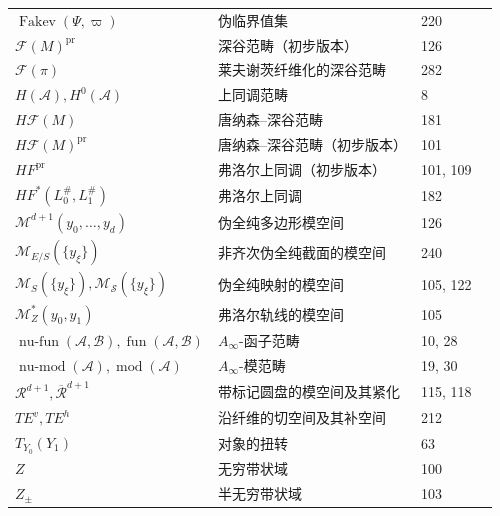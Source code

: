 \begin{longtable}{@{}p{.26\linewidth}p{.41\linewidth}p{.12\linewidth}p{.12\linewidth}@{}}
\(\operatorname{Fakev}(\Psi,\varpi)\) & 伪临界值集 & 220 & \pageref{ch:15-first-notions}\\
\(\mathcal F(M)^{\mathrm{pr}}\) & 深谷范畴（初步版本） & 126 & \pageref{ch:09-fukaya-preliminary}\\
\(\mathcal F(\pi)\) & 莱夫谢茨纤维化的深谷范畴 & 282 & \pageref{ch:18-fukaya-lefschetz}\\
\(H(\mathcal A),H^0(\mathcal A)\) & 上同调范畴 & 8 & \pageref{ch:01-definitions}\\
\(H\mathcal F(M)\) & 唐纳森--深谷范畴 & 181 & \pageref{ch:12-fukaya-complete}\\
\(H\mathcal F(M)^{\mathrm{pr}}\) & 唐纳森--深谷范畴（初步版本） & 101 & \pageref{ch:08-classical-floer}\\
\(HF^{\mathrm{pr}}\) & 弗洛尔上同调（初步版本） & 101, 109 & \pageref{ch:08-classical-floer}\\
\(HF^*(L_0^\#,L_1^\#)\) & 弗洛尔上同调 & 182 & \pageref{ch:12-fukaya-complete}\\
\(\mathcal M^{d+1}(y_0,\ldots,y_d)\) & 伪全纯多边形模空间 & 126 & \pageref{ch:09-fukaya-preliminary}\\
\(\mathcal M_{E/S}(\{y_\xi\})\) & 非齐次伪全纯截面的模空间 & 240 & \pageref{ch:17-pseudoholomorphic-sections}\\
\(\mathcal M_S(\{y_\xi\}),\mathcal M_{\mathcal S}(\{y_\xi\})\) & 伪全纯映射的模空间 & 105, 122 & \pageref{ch:09-fukaya-preliminary}\\
\(\mathcal M_Z^*(y_0,y_1)\) & 弗洛尔轨线的模空间 & 105 & \pageref{ch:08-classical-floer}\\
\(\operatorname{nu\text{-}fun}(\mathcal A,\mathcal B),\operatorname{fun}(\mathcal A,\mathcal B)\) & \(A_\infty\)-函子范畴 & 10, 28 & \pageref{ch:02-identity-morphisms}\\
\(\operatorname{nu\text{-}mod}(\mathcal A),\operatorname{mod}(\mathcal A)\) & \(A_\infty\)-模范畴 & 19, 30 & \pageref{ch:02-identity-morphisms}\\
\(\mathcal R^{d+1},\overline{\mathcal R}^{d+1}\) & 带标记圆盘的模空间及其紧化 & 115, 118 & \pageref{ch:09-fukaya-preliminary}\\
\(TE^v,TE^h\) & 沿纤维的切空间及其补空间 & 212 & \pageref{ch:15-first-notions}\\
\(T_{Y_0}(Y_1)\) & 对象的扭转 & 63 & \pageref{ch:04-idempotents}\\
\(Z\) & 无穷带状域 & 100 & \pageref{ch:08-classical-floer}\\
\(Z_\pm\) & 半无穷带状域 & 103 & \pageref{ch:08-classical-floer}\\
\bottomrule
\end{longtable}
\endgroup
